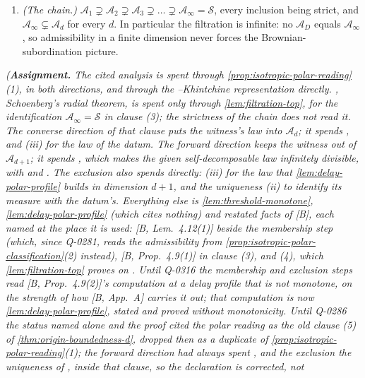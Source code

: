 \begin{theorem}
\begin{enumerate}
$d \ge 2$, and it is nonempty for every $d \ge 1$.
\item \emph{(The chain.)} $\mathcal{A}_1 \supsetneq \mathcal{A}_2 \supsetneq \mathcal{A}_3
\supsetneq \dots \supsetneq \mathcal{A}_\infty = \mathcal{S}$, every inclusion being strict, and
$\mathcal{A}_\infty \subsetneq \mathcal{A}_d$ for every $d$. In particular the filtration is
infinite: no $\mathcal{A}_D$ equals $\mathcal{A}_\infty$, so admissibility in a finite dimension
never forces the Brownian-subordination picture.
\end{enumerate}
\statusA\quad{}\quad{}\quad{}\quad{}\quad\emph{(\textbf{Assignment.} The
cited analysis is spent through \ref{prop:isotropic-polar-reading}(1), in both directions, and
through the \Levy--Khintchine representation directly. , Schoenberg's radial theorem,
is spent only through \ref{lem:filtration-top}, for the identification
$\mathcal{A}_\infty = \mathcal{S}$ in clause (3); the strictness of the chain does not read it. The converse direction of that clause puts
the witness's law into $\mathcal{A}_d$; it spends , and (iii) for the law of
the datum. The forward direction keeps the witness out of $\mathcal{A}_{d+1}$; it spends
, which makes the given self-decomposable law infinitely divisible, with 
and . The exclusion also spends  directly: (iii) for the law that
\ref{lem:delay-polar-profile} builds in dimension $d+1$, and the uniqueness (ii) to identify its
\Levy{} measure with the datum's. Everything else is \ref{lem:threshold-monotone},
\ref{lem:delay-polar-profile} (which cites nothing) and restated facts of [B], each named at the
place it is used: [B, Lem.~4.12(1)] beside the membership step (which, since Q-0281, reads the
admissibility from \ref{prop:isotropic-polar-classification}(2) instead), [B, Prop.~4.9(1)] in
clause (3), and (4), which \ref{lem:filtration-top} proves on . Until Q-0316 the membership and exclusion steps read [B, Prop.~4.9(2)]'s computation at a delay
profile that is not monotone, on the strength of how [B, App.~A] carries it out; that computation is
now \ref{lem:delay-polar-profile}, stated and proved without monotonicity. Until
Q-0286 the status named  alone and the proof cited the polar reading as the
old clause (5) of \ref{thm:origin-boundedness-d}, dropped then as a duplicate of
\ref{prop:isotropic-polar-reading}(1); the forward direction had always spent , and the
exclusion the uniqueness of , inside that clause, so the declaration is corrected, not
}
\end{theorem}
